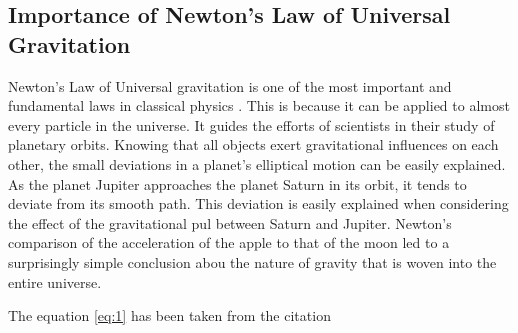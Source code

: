 \subsection{Importance of Newton's Law of Universal Gravitation} 
Newton's Law of Universal gravitation is one of the most important and fundamental laws in classical physics . This is because it can be applied to almost every particle in the universe. It guides the 
efforts of scientists in their study of planetary orbits. Knowing that all objects exert gravitational influences on each other, the small 
deviations in a planet's elliptical motion can be easily explained. As the planet Jupiter approaches the planet Saturn in its orbit, it tends to 
deviate from its smooth path. This deviation is easily explained when considering the effect of the gravitational pul between Saturn and Jupiter.
Newton's comparison of the acceleration of the apple to that of the moon led to a surprisingly simple conclusion abou the nature of gravity that is woven into the entire universe. \par
    The equation \ref{eq:1} has been taken from the citation~\cite{Verlinde2011}
%
%              
